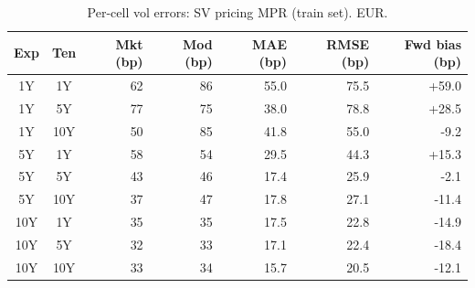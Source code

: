\begin{table}[H]
\centering
\caption{Per-cell vol errors: SV pricing MPR (train set). EUR.}
\label{tab:sv_pricing_per_cell_train}
\small
\begin{tabular}{@{}ccrrrrr@{}}
\toprule
\textbf{Exp} & \textbf{Ten} & \textbf{Mkt (bp)} & \textbf{Mod (bp)} & \textbf{MAE (bp)} & \textbf{RMSE (bp)} & \textbf{Fwd bias (bp)} \\
\midrule
  1Y & 1Y & 62 & 86 & 55.0 & 75.5 & +59.0 \\
  1Y & 5Y & 77 & 75 & 38.0 & 78.8 & +28.5 \\
  1Y & 10Y & 50 & 85 & 41.8 & 55.0 & -9.2 \\
  \midrule
  5Y & 1Y & 58 & 54 & 29.5 & 44.3 & +15.3 \\
  5Y & 5Y & 43 & 46 & 17.4 & 25.9 & -2.1 \\
  5Y & 10Y & 37 & 47 & 17.8 & 27.1 & -11.4 \\
  \midrule
  10Y & 1Y & 35 & 35 & 17.5 & 22.8 & -14.9 \\
  10Y & 5Y & 32 & 33 & 17.1 & 22.4 & -18.4 \\
  10Y & 10Y & 33 & 34 & 15.7 & 20.5 & -12.1 \\
\bottomrule
\end{tabular}
\end{table}